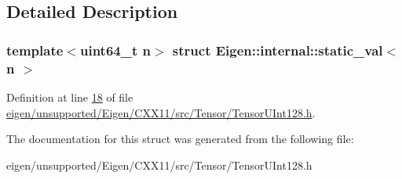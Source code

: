 \subsection{Detailed Description}
\subsubsection*{template$<$uint64\+\_\+t n$>$\newline
struct Eigen\+::internal\+::static\+\_\+val$<$ n $>$}



Definition at line \hyperlink{eigen_2unsupported_2_eigen_2_c_x_x11_2src_2_tensor_2_tensor_u_int128_8h_source_l00018}{18} of file \hyperlink{eigen_2unsupported_2_eigen_2_c_x_x11_2src_2_tensor_2_tensor_u_int128_8h_source}{eigen/unsupported/\+Eigen/\+C\+X\+X11/src/\+Tensor/\+Tensor\+U\+Int128.\+h}.



The documentation for this struct was generated from the following file\+:\begin{DoxyCompactItemize}
\item 
eigen/unsupported/\+Eigen/\+C\+X\+X11/src/\+Tensor/\+Tensor\+U\+Int128.\+h\end{DoxyCompactItemize}
